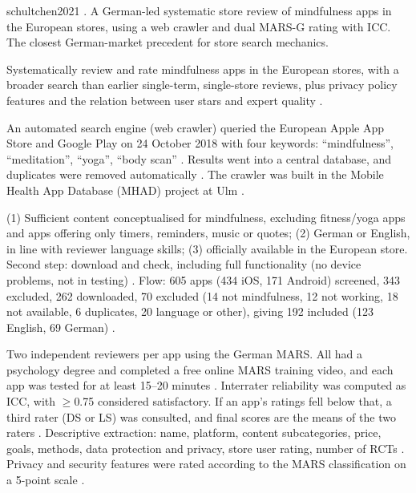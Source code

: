 \begin{papercard}{schultchen2021}
   . A German-led systematic store review of mindfulness apps in the European stores, using a web crawler and dual MARS-G rating with ICC. The closest German-market precedent for store search mechanics.

 Systematically review and rate mindfulness apps in the European stores, with a broader search than earlier single-term, single-store reviews, plus privacy policy features and the relation between user stars and expert quality .

 An automated search engine (web crawler) queried the European Apple App Store and Google Play on 24 October 2018 with four keywords: ``mindfulness'', ``meditation'', ``yoga'', ``body scan'' . Results went into a central database, and duplicates were removed automatically . The crawler was built in the Mobile Health App Database (MHAD) project at Ulm .

 (1) Sufficient content conceptualised for mindfulness, excluding fitness/yoga apps and apps offering only timers, reminders, music or quotes; (2) German or English, in line with reviewer language skills; (3) officially available in the European store. Second step: download and check, including full functionality (no device problems, not in testing) . Flow: 605 apps (434 iOS, 171 Android) screened, 343 excluded, 262 downloaded, 70 excluded (14 not mindfulness, 12 not working, 18 not available, 6 duplicates, 20 language or other), giving 192 included (123 English, 69 German) .

 Two independent reviewers per app using the German MARS. All had a psychology degree and completed a free online MARS training video, and each app was tested for at least 15--20 minutes . Interrater reliability was computed as ICC, with $\geq$0.75 considered satisfactory. If an app's ratings fell below that, a third rater (DS or LS) was consulted, and final scores are the means of the two raters . Descriptive extraction: name, platform, content subcategories, price, goals, methods, data protection and privacy, store user rating, number of RCTs . Privacy and security features were rated according to the MARS classification on a 5-point scale .


\end{papercard}
